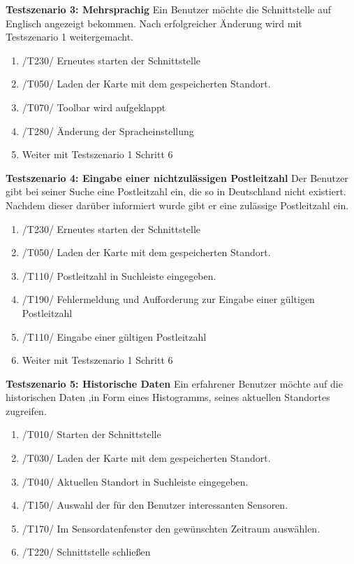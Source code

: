 \textbf{Testszenario 3: Mehrsprachig}
\newline
Ein Benutzer möchte die Schnittstelle auf Englisch angezeigt bekommen. Nach erfolgreicher Änderung wird mit Testszenario 1 weitergemacht.
\begin{enumerate} [noitemsep]
    \item /T230/ Erneutes starten der Schnittstelle
    \item /T050/ Laden der Karte mit dem gespeicherten Standort.
    \item /T070/ Toolbar wird aufgeklappt
    \item /T280/ Änderung der Spracheinstellung
    \item Weiter mit Testszenario 1 Schritt 6
\end{enumerate}

\textbf{Testszenario 4: Eingabe einer nichtzulässigen Postleitzahl}
\newline
Der Benutzer gibt bei seiner Suche eine Postleitzahl ein, die so in Deutschland nicht existiert. Nachdem dieser darüber informiert wurde gibt er eine zulässige Postleitzahl ein.
\begin{enumerate} [noitemsep]
    \item /T230/ Erneutes starten der Schnittstelle
    \item /T050/ Laden der Karte mit dem gespeicherten Standort.
    \item /T110/ Postleitzahl in Suchleiste eingegeben.
    \item /T190/ Fehlermeldung und Aufforderung zur Eingabe einer gültigen Postleitzahl
    \item /T110/ Eingabe einer gültigen Postleitzahl
    \item Weiter mit Testszenario 1 Schritt 6
\end{enumerate}

\textbf{Testszenario 5: Historische Daten}
\newline
Ein erfahrener Benutzer möchte auf die historischen Daten ,in Form eines Histogramms, seines aktuellen Standortes zugreifen.
\begin{enumerate} [noitemsep]
    \item /T010/ Starten der Schnittstelle
    \item /T030/ Laden der Karte mit dem gespeicherten Standort.
    \item /T040/ Aktuellen Standort in Suchleiste eingegeben.
    \item /T150/ Auswahl der für den Benutzer interessanten Sensoren.
    \item /T170/ Im Sensordatenfenster den gewünschten Zeitraum auswählen.
    \item /T220/ Schnittstelle schließen
\end{enumerate}

